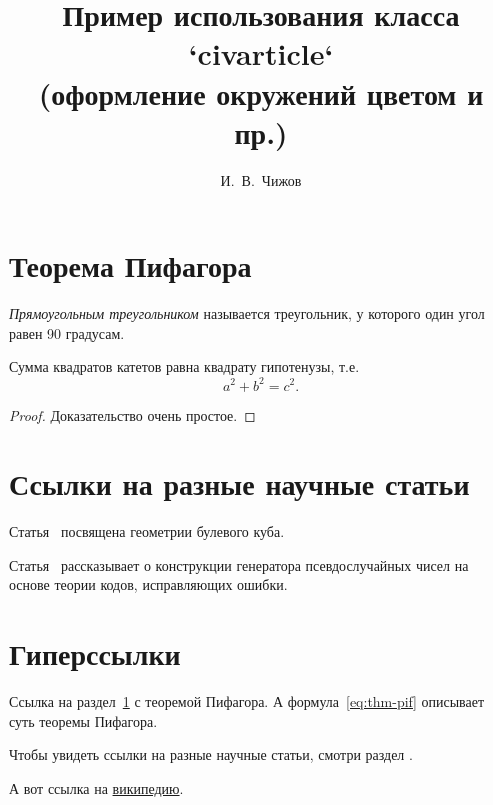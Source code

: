 \documentclass[12pt]{civarticle}
\title{
    Пример использования класса `civarticle`\\
    \small{(оформление окружений цветом и пр.)}
}
\author{И.~В.~Чижов}
\begin{document}
    \section{Теорема Пифагора}
    \label{sec:thm-pif}
    \begin{definition}
        \label{def:triangle}
        \emph{Прямоугольным треугольником} называется треугольник, у которого один угол равен 90 градусам.
    \end{definition}
    \begin{theorem}
        Сумма квадратов катетов равна квадрату гипотенузы, т.е.
        \begin{equation}
            \label{eq:thm-pif}
            a^2+b^2=c^2.
        \end{equation}
    \end{theorem}
    \begin{proof}
        Доказательство очень простое.
    \end{proof}
    \Blindtext[11][1]

    \section{Ссылки на разные научные статьи}
    \label{sec:ref-to-articles}

    Статья~\cite{ahlswede1977} посвящена геометрии булевого куба.

    Статья~\cite{ahmed2013} рассказывает о конструкции генератора псевдослучайных чисел на основе теории кодов, исправляющих ошибки.

    \section{Гиперссылки}
    \label{sec:hyper}

    Ссылка на раздел~\ref{sec:thm-pif} с теоремой Пифагора.
    А формула~\eqref{eq:thm-pif} описывает суть теоремы Пифагора.

    Чтобы увидеть ссылки на разные научные статьи, смотри раздел \hyperref[sec:ref-to-articles]{}.
    
    А вот ссылка на \href{www.wikipedia.ru}{википедию}.
\end{document}
